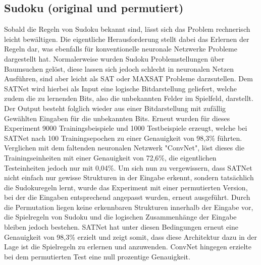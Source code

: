 \subsection{Sudoku (original und permutiert)}
\label{subsec:sud}

Sobald die Regeln von Sudoku bekannt sind, lässt sich das Problem rechnerisch leicht bewältigen. Die eigentliche Herausforderung stellt dabei das Erlernen der Regeln dar, was ebenfalls für konventionelle neuronale Netzwerke Probleme dargestellt hat. Normalerweise wurden Sudoku Problemstellungen über Baumsuchen gelöst, diese lassen sich jedoch schlecht in neuronalen Netzen Ausführen, sind aber leicht als SAT oder MAXSAT Probleme darzsutellen. Dem SATNet wird hierbei als Input eine logische Bitdarstellung geliefert, welche zudem die zu lernenden Bits, also die unbekannten Felder im Spielfeld, darstellt. Der Output besteht folglich wieder aus einer Bitdarstellung mit zufällig Gewählten Eingaben für die unbekannten Bits. Erneut wurden für dieses Experiment 9000 Trainingsbeispiele und 1000 Testbeispiele erzeugt, welche bei SATNet nach 100 Trainingsepochen zu einer Genauigkeit von 98,3\% führten. Verglichen mit dem faltenden neuronalen Netzwerk "ConvNet", löst dieses die Trainingseinheiten mit einer Genauigkeit von 72,6\%, die eigentlichen Testeinheiten jedoch nur mit 0,04\%. 
Um sich nun zu vergewissern, dass SATNet nicht einfach nur gewisse Strukturen in der Eingabe erkennt, sondern tatsächlich die Sudokuregeln lernt, wurde das Experiment mit einer permutierten Version, bei der die Eingaben entsprechend angepasst wurden, erneut ausgeführt. Durch die Permutation liegen keine erkennbaren Strukturen innerhalb der Eingabe vor, die Spielregeln von Sudoku und die logischen Zusammenhänge der Eingabe bleiben jedoch bestehen. SATNet hat unter diesen Bedingungen erneut eine Genauigkeit von 98,3\% erzielt und zeigt somit, dass diese Architektur dazu in der Lage ist die Spielregeln zu erlernen und anzuwenden. ConvNet hingegen erzielte bei dem permutierten Test eine null prozentige Genauigkeit. 
\cite[p.~6-7]{https://doi.org/10.48550/arxiv.1905.12149}

